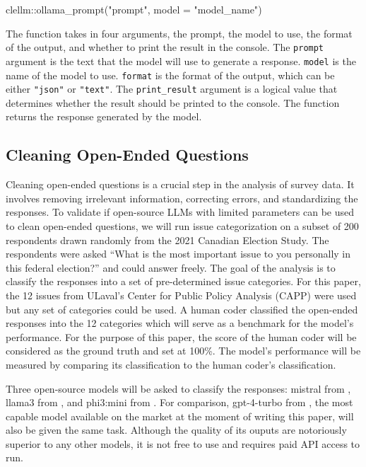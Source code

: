 \documentclass[
  authoryear,
  preprint,
  3p]{elsarticle}
\newenvironment{Shaded}{\begin{snugshade}}{\end{snugshade}}
\newcommand{\AttributeTok}[1]{\textcolor[rgb]{0.40,0.45,0.13}{#1}}
\newcommand{\FunctionTok}[1]{\textcolor[rgb]{0.28,0.35,0.67}{#1}}
\newcommand{\NormalTok}[1]{\textcolor[rgb]{0.00,0.23,0.31}{#1}}
\newcommand{\SpecialCharTok}[1]{\textcolor[rgb]{0.37,0.37,0.37}{#1}}
\newcommand{\StringTok}[1]{\textcolor[rgb]{0.13,0.47,0.30}{#1}}
\begin{document}
\begin{Shaded}
\begin{Highlighting}[]
\NormalTok{clellm}\SpecialCharTok{::}\FunctionTok{ollama\_prompt}\NormalTok{(}\StringTok{"prompt"}\NormalTok{, }\AttributeTok{model =} \StringTok{"model\_name"}\NormalTok{)}
\end{Highlighting}
\end{Shaded}

The function takes in four arguments, the prompt, the model to use, the
format of the output, and whether to print the result in the console.
The \texttt{prompt} argument is the text that the model will use to
generate a response. \texttt{model} is the name of the model to use.
\texttt{format} is the format of the output, which can be either
\texttt{"json"} or \texttt{"text"}. The \texttt{print\_result} argument
is a logical value that determines whether the result should be printed
to the console. The function returns the response generated by the
model.

\subsection{Cleaning Open-Ended
Questions}\label{cleaning-open-ended-questions}

Cleaning open-ended questions is a crucial step in the analysis of
survey data. It involves removing irrelevant information, correcting
errors, and standardizing the responses. To validate if open-source LLMs
with limited parameters can be used to clean open-ended questions, we
will run issue categorization on a subset of 200 respondents drawn
randomly from the 2021 Canadian Election Study. The respondents were
asked ``What is the most important issue to you personally in this
federal election?'' and could answer freely. The goal of the analysis is
to classify the responses into a set of pre-determined issue categories.
For this paper, the 12 issues from ULaval's Center for Public Policy
Analysis (CAPP) were used but any set of categories could be used. A
human coder classified the open-ended responses into the 12 categories
which will serve as a benchmark for the model's performance. For the
purpose of this paper, the score of the human coder will be considered
as the ground truth and set at 100\%. The model's performance will be
measured by comparing its classification to the human coder's
classification.

Three open-source models will be asked to classify the responses:
mistral from \citet{jiang_etal23}, llama3 from \citet{meta24}, and
phi3:mini from \citet{abdin_etal24}. For comparison, gpt-4-turbo from
\citet{openai23b}, the most capable model available on the market at the
moment of writing this paper, will also be given the same task. Although
the quality of its ouputs are notoriously superior to any other models,
it is not free to use and requires paid API access to run.
\end{document}
